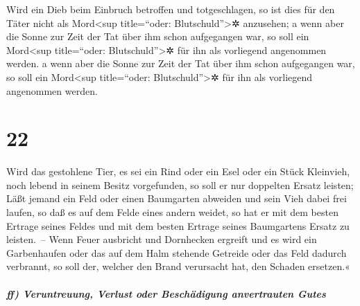  Wird ein Dieb beim Einbruch betroffen und totgeschlagen,
so ist dies für den Täter nicht als Mord\textless sup title=``oder:
Blutschuld''\textgreater✲ anzusehen;  a wenn aber die
Sonne zur Zeit der Tat über ihm schon aufgegangen war, so soll ein
Mord\textless sup title=``oder: Blutschuld''\textgreater✲ für ihn als
vorliegend angenommen werden.  a wenn aber die Sonne zur
Zeit der Tat über ihm schon aufgegangen war, so soll ein
Mord\textless sup title=``oder: Blutschuld''\textgreater✲ für ihn als
vorliegend angenommen werden.

\hypertarget{section-21}{%
\section{22}\label{section-21}}

 Wird das gestohlene Tier, es sei ein Rind oder ein Esel
oder ein Stück Kleinvieh, noch lebend in seinem Besitz vorgefunden, so
soll er nur doppelten Ersatz leisten;  Läßt jemand ein
Feld oder einen Baumgarten abweiden und sein Vieh dabei frei laufen, so
daß es auf dem Felde eines andern weidet, so hat er mit dem besten
Ertrage seines Feldes und mit dem besten Ertrage seines Baumgartens
Ersatz zu leisten.~--  Wenn Feuer ausbricht und Dornhecken
ergreift und es wird ein Garbenhaufen oder das auf dem Halm stehende
Getreide oder das Feld dadurch verbrannt, so soll der, welcher den Brand
verursacht hat, den Schaden ersetzen.«

\hypertarget{ff-veruntreuung-verlust-oder-beschuxe4digung-anvertrauten-gutes}{%
\subparagraph{ff) Veruntreuung, Verlust oder Beschädigung anvertrauten
Gutes}\label{ff-veruntreuung-verlust-oder-beschuxe4digung-anvertrauten-gutes}}

